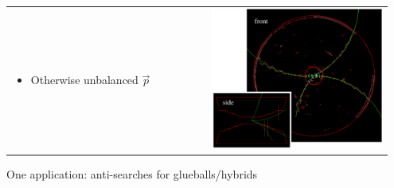 \begin{slide*}
\begin{minipage}[t]{\linewidth}
\begin{tabular}{p{0.5\linewidth} p{0.45\linewidth}}
\begin{minipage}{\linewidth}
\begin{itemize}
      \item Otherwise unbalanced $\vec{p}$

    \end{itemize}
  \end{minipage} &
  \begin{minipage}{\linewidth}
    \includegraphics[width=\linewidth]{two_photon_event.eps}
  \end{minipage}
\end{tabular}

\vspace{0.8 cm}
One application: anti-searches for glueballs/hybrids

\end{minipage}
\end{slide*}


